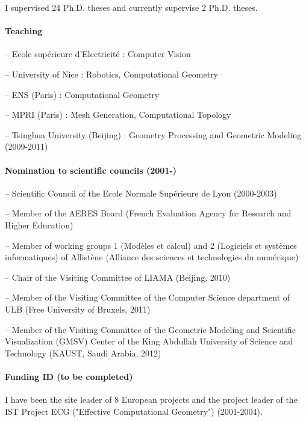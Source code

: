 I supervised 24 Ph.D. theses and currently supervise 2 Ph.D. theses.

\paragraph{Teaching} \mbox{}

-- Ecole sup\'erieure d'Electricit\'e : Computer Vision

-- University of Nice : Robotics, Computational Geometry

-- ENS (Paris) : Computational Geometry

-- MPRI (Paris) : Mesh Generation,  Computational Topology

-- Tsinghua University (Beijing) : Geometry Processing and Geometric Modeling (2009-2011)


\paragraph{Nomination to scientific councils (2001-)} \mbox{}

-- Scientific Council of the Ecole Normale Sup\'erieure de Lyon (2000-2003)

-- Member of the AERES Board (French Evaluation Agency for
  Research and Higher Education)

-- Member of working groups 1 (Mod\`eles et calcul) and 2
  (Logiciels et systèmes informatiques) of Allist\`ene (Alliance des sciences et technologies du num\'erique)


-- Chair of the Visiting Committee of LIAMA (Beijing, 2010)

-- Member of the Visiting Committee of the Computer Science department of ULB (Free University of Bruxels, 2011)

-- Member of the Visiting Committee of the Geometric Modeling and Scientific Visualization (GMSV) Center of the King Abdullah University of Science and Technology (KAUST, Saudi Arabia, 2012)


\paragraph{Funding ID (to be completed)} \mbox{}

I have been the site leader of 8 European projects and the project leader of  the IST Project ECG ("Effective Computational Geometry") (2001-2004).

